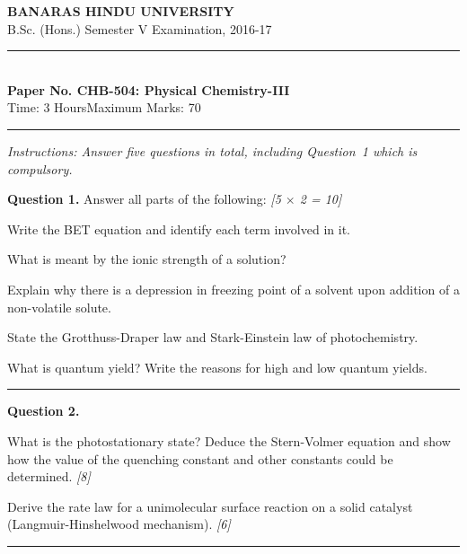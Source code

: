 \documentclass[11pt,a4paper]{article}
\newcommand{\pts}[1]{\hfill   \textit{[#1]}}
\begin{document}
\begin{center}
  {\large\bfseries BANARAS HINDU UNIVERSITY}\\[2pt]
  {\normalsize B.Sc. (Hons.) Semester V Examination, 2016-17}\\[6pt]
  \rule{0.8\linewidth}{0.5pt}\\[6pt]
  {\large\bfseries Paper No. CHB-504: Physical Chemistry-III}\\[4pt]
  {\normalsize Time: 3 Hours\hfill Maximum Marks: 70}
\end{center}
\rule{\linewidth}{0.4pt}
\small



\noindent   \textit{Instructions: Answer five questions in total, including Question~1 which is compulsory.}

\normalsize
\bigskip




\noindent   \textbf{Question 1.} Answer all parts of the following: \pts{5 $ \times$ 2 = 10}

\begin{parts}
  \item Write the BET equation and identify each term involved in it.
  \item What is meant by the ionic strength of a solution?
  \item Explain why there is a depression in freezing point of a solvent upon addition of a non-volatile solute.
  \item State the Grotthuss-Draper law and Stark-Einstein law of photochemistry.
  \item What is quantum yield? Write the reasons for high and low quantum yields.
\end{parts}

\medskip\rule{\linewidth}{0.2pt}




\noindent   \textbf{Question 2.}

\begin{parts}
  \item What is the photostationary state? Deduce the Stern-Volmer equation and show how the value of the quenching constant and other constants could be determined. \pts{8}
  \item Derive the rate law for a unimolecular surface reaction on a solid catalyst (Langmuir-Hinshelwood mechanism). \pts{6}
\end{parts}

\medskip\rule{\linewidth}{0.2pt}
\end{document}

